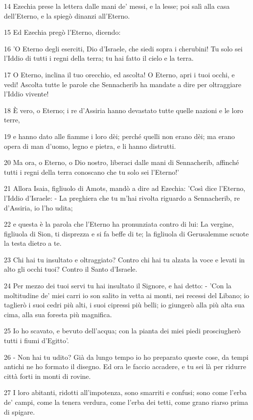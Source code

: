 \par 14 Ezechia prese la lettera dalle mani de' messi, e la lesse; poi salì alla casa dell'Eterno, e la spiegò dinanzi all'Eterno.
\par 15 Ed Ezechia pregò l'Eterno, dicendo:
\par 16 'O Eterno degli eserciti, Dio d'Israele, che siedi sopra i cherubini! Tu solo sei l'Iddio di tutti i regni della terra; tu hai fatto il cielo e la terra.
\par 17 O Eterno, inclina il tuo orecchio, ed ascolta! O Eterno, apri i tuoi occhi, e vedi! Ascolta tutte le parole che Sennacherib ha mandate a dire per oltraggiare l'Iddio vivente!
\par 18 È vero, o Eterno; i re d'Assiria hanno devastato tutte quelle nazioni e le loro terre,
\par 19 e hanno dato alle fiamme i loro dèi; perché quelli non erano dèi; ma erano opera di man d'uomo, legno e pietra, e li hanno distrutti.
\par 20 Ma ora, o Eterno, o Dio nostro, liberaci dalle mani di Sennacherib, affinché tutti i regni della terra conoscano che tu solo sei l'Eterno!'
\par 21 Allora Isaia, figliuolo di Amots, mandò a dire ad Ezechia: 'Così dice l'Eterno, l'Iddio d'Israele: - La preghiera che tu m'hai rivolta riguardo a Sennacherib, re d'Assiria, io l'ho udita;
\par 22 e questa è la parola che l'Eterno ha pronunziata contro di lui: La vergine, figliuola di Sion, ti disprezza e si fa beffe di te; la figliuola di Gerusalemme scuote la testa dietro a te.
\par 23 Chi hai tu insultato e oltraggiato? Contro chi hai tu alzata la voce e levati in alto gli occhi tuoi? Contro il Santo d'Israele.
\par 24 Per mezzo dei tuoi servi tu hai insultato il Signore, e hai detto: - 'Con la moltitudine de' miei carri io son salito in vetta ai monti, nei recessi del Libano; io taglierò i suoi cedri più alti, i suoi cipressi più belli; io giungerò alla più alta sua cima, alla sua foresta più magnifica.
\par 25 Io ho scavato, e bevuto dell'acqua; con la pianta dei miei piedi prosciugherò tutti i fiumi d'Egitto'.
\par 26 - Non hai tu udito? Già da lungo tempo io ho preparato queste cose, da tempi antichi ne ho formato il disegno. Ed ora le faccio accadere, e tu sei là per ridurre città forti in monti di rovine.
\par 27 I loro abitanti, ridotti all'impotenza, sono smarriti e confusi; sono come l'erba de' campi, come la tenera verdura, come l'erba dei tetti, come grano riarso prima di spigare.

